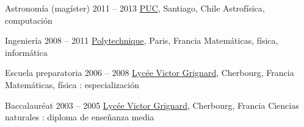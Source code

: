 



\begin{coordinatelist}
\end{coordinatelist}




\begin{yearlist}[7.7][0.7][3.5]

\item[Astronomía (magíster)]{2011 -- 2013}
	{
	\href{http://www.uc.cl/}{PUC}, Santiago, Chile
	}
    {Astrofísica, computación}
    

\item[Ingeniería]{2008 -- 2011}
	{
	\href{https://www.polytechnique.edu/}{Polytechnique}, Paris, Francia
	}
    {Matemáticas, física, informática}


\item[Escuela preparatoria]{2006 -- 2008}
	{
	\href{http://www.lycee-grignard.fr/}{Lyc\'ee Victor Grignard}, Cherbourg, Francia
	}
	{Matemáticas, física : especialización}


\item[Baccalaur\'eat]{2003 -- 2005}
	{
	\href{http://www.lycee-grignard.fr/}{Lyc\'ee Victor Grignard}, Cherbourg, Francia
	}
  {Ciencias naturales : diploma de enseñanza media}
    
\end{yearlist}


